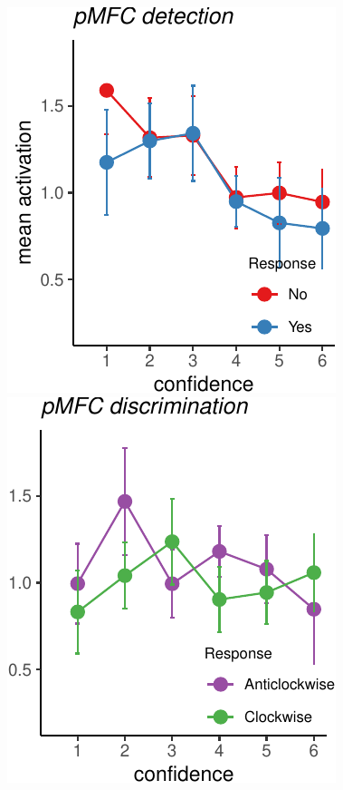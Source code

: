 \documentclass[]{article}
\begin{document}
~

~

\includegraphics{Chudi-Thesis_files/figure-latex/unnamed-chunk-9-1.pdf}
\includegraphics{Chudi-Thesis_files/figure-latex/unnamed-chunk-9-2.pdf}
\end{document}
